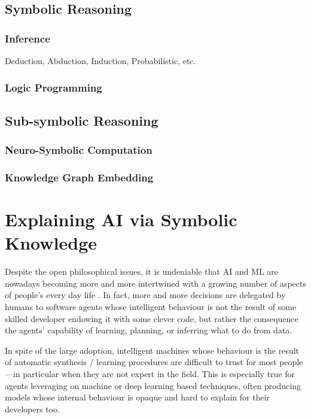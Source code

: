 \documentclass[12pt,a4paper,openright,twoside]{book}
\begin{document}
\section{Symbolic Reasoning}

\subsection{Inference}

Deduction, Abduction, Induction, Probabilistic, etc.

\subsection{Logic Programming}

\cite{logictech-information11}
\cite{lptech4mas-aamas2021}
\cite{lptech4mas-jaamas35}
\cite{Korner2020HistoryFuturePrologTPLP}

\section{Sub-symbolic Reasoning}

\subsection{Neuro-Symbolic Computation}

\subsection{Knowledge Graph Embedding}

\chapter{Explaining AI via Symbolic Knowledge}


Despite the open philosophical issues, it is undeniable that AI and ML are nowadays becoming more and more intertwined with a growing number of aspects of people's every day life \cite{helbing2019, elliott2019}. 
%
In fact, more and more decisions are delegated by humans to software agents whose intelligent behaviour is not the result of some skilled developer endowing it with some clever code, but rather the consequence the agents' capability of learning, planning, or inferring what to do from data.

In spite of the large adoption, intelligent machines whose behaviour is the result of automatic synthesis / learning procedures are difficult to trust for most people---in particular when they are not expert in the field.
%
This is especially true for agents leveraging on machine or deep learning based techniques, often producing models whose internal behaviour is opaque and hard to explain for their developers too.
\end{document}
